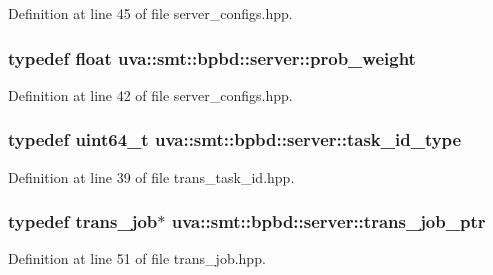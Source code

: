 Definition at line 45 of file server\+\_\+configs.\+hpp.

\hypertarget{namespaceuva_1_1smt_1_1bpbd_1_1server_a01e9ea4de9c226f4464862e84ff0bbcc}{}
\subsubsection[{prob\+\_\+weight}]{\setlength{\rightskip}{0pt plus 5cm}typedef float {\bf uva\+::smt\+::bpbd\+::server\+::prob\+\_\+weight}}\label{namespaceuva_1_1smt_1_1bpbd_1_1server_a01e9ea4de9c226f4464862e84ff0bbcc}


Definition at line 42 of file server\+\_\+configs.\+hpp.

\hypertarget{namespaceuva_1_1smt_1_1bpbd_1_1server_a67f8b384118030b4ae63f1239253f9ed}{}
\subsubsection[{task\+\_\+id\+\_\+type}]{\setlength{\rightskip}{0pt plus 5cm}typedef uint64\+\_\+t {\bf uva\+::smt\+::bpbd\+::server\+::task\+\_\+id\+\_\+type}}\label{namespaceuva_1_1smt_1_1bpbd_1_1server_a67f8b384118030b4ae63f1239253f9ed}


Definition at line 39 of file trans\+\_\+task\+\_\+id.\+hpp.

\hypertarget{namespaceuva_1_1smt_1_1bpbd_1_1server_acb76132c82e66b5dbf7e3aa0e5af2580}{}
\subsubsection[{trans\+\_\+job\+\_\+ptr}]{\setlength{\rightskip}{0pt plus 5cm}typedef {\bf trans\+\_\+job}$\ast$ {\bf uva\+::smt\+::bpbd\+::server\+::trans\+\_\+job\+\_\+ptr}}\label{namespaceuva_1_1smt_1_1bpbd_1_1server_acb76132c82e66b5dbf7e3aa0e5af2580}


Definition at line 51 of file trans\+\_\+job.\+hpp.

